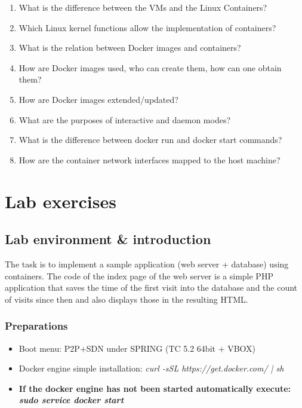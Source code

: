 \documentclass[a4paper]{article}
\begin{document}
\begin{enumerate}
    \item What is the difference between the VMs and the Linux Containers?
    \item Which Linux kernel functions allow the implementation of containers?
    \item What is the relation between Docker images and containers?
    \item How are Docker images used, who can create them, how can one obtain them?
    \item How are Docker images extended/updated?
    \item What are the purposes of interactive and daemon modes?
    \item What is the difference between docker run and docker start commands?
    \item How are the container network interfaces mapped to the host machine?
\end{enumerate}

\section{Lab exercises}

\subsection{Lab environment \& introduction}

The task is to implement a sample application (web server + database) using containers. The code of the index page of
the web server is a simple PHP application that saves the time of the first visit into the database and the count of
visits since then and also displays those in the resulting HTML.

\subsubsection{Preparations}
\begin{itemize}

    \item Boot menu: P2P+SDN under SPRING (TC 5.2 64bit + VBOX)

    \item Docker engine simple installation: \emph{curl -sSL https://get.docker.com/ | sh}

    \item \textbf{If the docker engine has not been started automatically execute: \emph{sudo service docker start}}

\end{itemize}
\end{document}

